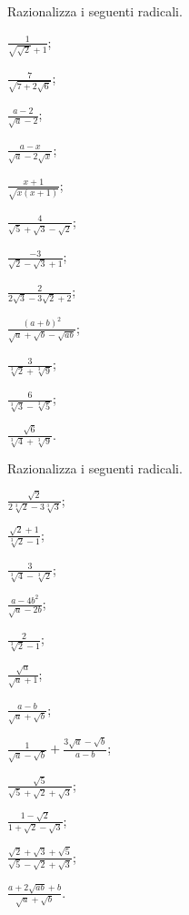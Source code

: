 \begin{esercizio}
 \label{ese:2.92}
Razionalizza i seguenti radicali.
 \begin{multicols}{4}
 \begin{enumeratea}
 \item $\frac 1{\sqrt{\sqrt 2}+1}$;
 \item $\frac 7{\sqrt{7+2\sqrt 6}}$;
 \item $\frac{a-2}{\sqrt a-2}$;
 \item $\frac{a-x}{\sqrt a-2\sqrt x}$;
 \item $\frac{x+1}{\sqrt{x(x+1)}}$;
 \item $\frac 4{\sqrt 5+\sqrt 3-\sqrt 2}$;
 \item $\frac{-3}{\sqrt 2-\sqrt 3+1}$;
 \item $\frac 2{2\sqrt 3-3\sqrt 2+2}$;
 \item $\frac{(a+b)^2}{\sqrt a+\sqrt b-\sqrt{ab}}$;
 \item $\frac 3{\sqrt[3]2+\sqrt[3]9}$;
 \item $\frac 6{\sqrt[3]3-\sqrt[3]5}$;
 \item $\frac{\sqrt 6}{\sqrt[3]4+\sqrt[3]9}$.
 \end{enumeratea}
 \end{multicols}
\end{esercizio}

\begin{esercizio}[\Ast]
 \label{ese:2.93}
Razionalizza i seguenti radicali.
 \begin{multicols}{3}
 \begin{enumeratea}
 \item $\frac{\sqrt 2}{2\sqrt[3]2-3\sqrt[3]3}$;
 \item $\frac{\sqrt 2+1}{\sqrt[3]2-1}$;
 \item $\frac 3{\sqrt[3]4-\sqrt[3]2}$;
 \item $\frac{a-4b^2}{\sqrt a-2b}$;
 \item $\frac 2{\sqrt[3]2-1}$;
 \item $\frac{\sqrt a}{\sqrt a+1}$;
 \item $\frac{a-b}{\sqrt a+\sqrt b}$;
 \item $\frac 1{\sqrt a-\sqrt b}+\frac{3\sqrt a-\sqrt b}{a-b}$;
 \item $\frac{\sqrt 5}{\sqrt 5+\sqrt 2+\sqrt 3}$;
 \item $\frac{1-\sqrt 2}{1+\sqrt 2-\sqrt 3}$;
 \item $\frac{\sqrt 2+\sqrt 3+\sqrt 5}{\sqrt 5-\sqrt 2+\sqrt 3}$;
 \item $\frac{a+2\sqrt{\mathit{ab}}+b}{\sqrt a+\sqrt b}$.
 \end{enumeratea}
 \end{multicols}
\end{esercizio}


